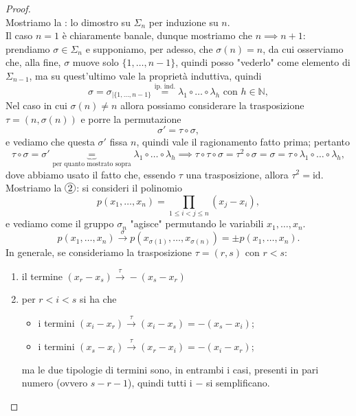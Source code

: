 \begin{proof} \hspace{1cm} \\
    Mostriamo la : lo dimostro su $\Sigma_n$ per induzione su $n$. \\
    Il caso $n=1$ è chiaramente banale, dunque mostriamo che $n \implies n+1$: prendiamo $\sigma \in \Sigma_n$ e supponiamo, per adesso, che $\sigma(n)=n$, da cui osserviamo che, alla fine, $\sigma$ muove solo $\{ 1, \ldots, n-1\}$, quindi posso "vederlo" come elemento di $\Sigma_{n-1}$, ma su quest'ultimo vale la proprietà induttiva, quindi
    $$
        \sigma = \sigma_{|\{ 1, \ldots, n-1 \} } \stackrel{\text{ip. ind.}}{=} \lambda_1 \circ \ldots \circ \lambda_h \text{ con } h \in \mathbb{N},
    $$
    Nel caso in cui $\sigma(n) \neq n$ allora possiamo considerare la trasposizione $\tau = (n, \sigma(n))$ e porre la permutazione
    $$
        \sigma' = \tau \circ \sigma,
    $$
    e vediamo che questa $\sigma'$ fissa $n$, quindi vale il ragionamento fatto prima; pertanto
    $$
        \tau \circ \sigma = \sigma' \underbrace{=}_{\text{per quanto mostrato sopra}} \lambda_1 \circ \ldots \circ \lambda_h \implies \tau \circ \tau \circ \sigma = \tau^2 \circ \sigma = \sigma = \tau \circ \lambda_1 \circ \ldots \circ \lambda_h,
    $$
    dove abbiamo usato il fatto che, essendo $\tau$ una trasposizione, allora $\tau^2 = \text{id}$.
    Mostriamo la $\circled{2}$: si consideri il polinomio
    $$
        p(x_1, \ldots, x_n) = \prod_{1 \leq i < j \leq n} (x_j - x_i),
    $$
    e vediamo come il gruppo $\sigma_n$ "agisce" permutando le variabili $x_1, \ldots, x_n$.
    $$
        p(x_1, \ldots, x_n) \stackrel{\sigma}{\rightarrow} p(x_{\sigma(1)}, \ldots, x_{\sigma(n)}) = \pm p(x_1, \ldots, x_n).
    $$
    In generale, se consideriamo la trasposizione $\tau = (r,s)$ con $r<s$:
    \begin{enumerate}[label=\protect\circled{\arabic*}]
        \item il termine $(x_r - x_s) \stackrel{\tau}{\rightarrow} -(x_s - x_r)$
        \item per $r < i < s$ si ha che 
        \begin{itemize}
            \item i termini $(x_i - x_r) \stackrel{\tau}{\rightarrow} (x_i - x_s) = -(x_s - x_i)$;
            \item i termini $(x_s - x_i) \stackrel{\tau}{\rightarrow} (x_r - x_i) = -(x_i - x_r)$; 
        \end{itemize}
        ma le due tipologie di termini sono, in entrambi i casi, presenti in pari numero (ovvero $s-r-1$), quindi tutti i $-$ si semplificano.

\end{enumerate}
\end{proof}
